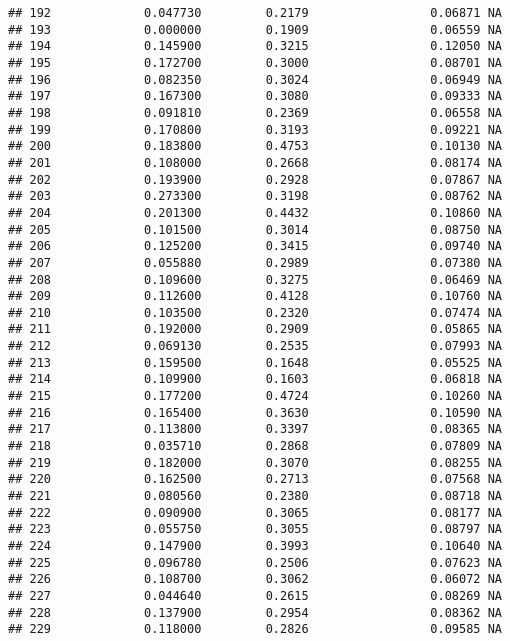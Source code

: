 \documentclass[
]{article}
\begin{document}
\begin{verbatim}
## 192             0.047730         0.2179                 0.06871 NA
## 193             0.000000         0.1909                 0.06559 NA
## 194             0.145900         0.3215                 0.12050 NA
## 195             0.172700         0.3000                 0.08701 NA
## 196             0.082350         0.3024                 0.06949 NA
## 197             0.167300         0.3080                 0.09333 NA
## 198             0.091810         0.2369                 0.06558 NA
## 199             0.170800         0.3193                 0.09221 NA
## 200             0.183800         0.4753                 0.10130 NA
## 201             0.108000         0.2668                 0.08174 NA
## 202             0.193900         0.2928                 0.07867 NA
## 203             0.273300         0.3198                 0.08762 NA
## 204             0.201300         0.4432                 0.10860 NA
## 205             0.101500         0.3014                 0.08750 NA
## 206             0.125200         0.3415                 0.09740 NA
## 207             0.055880         0.2989                 0.07380 NA
## 208             0.109600         0.3275                 0.06469 NA
## 209             0.112600         0.4128                 0.10760 NA
## 210             0.103500         0.2320                 0.07474 NA
## 211             0.192000         0.2909                 0.05865 NA
## 212             0.069130         0.2535                 0.07993 NA
## 213             0.159500         0.1648                 0.05525 NA
## 214             0.109900         0.1603                 0.06818 NA
## 215             0.177200         0.4724                 0.10260 NA
## 216             0.165400         0.3630                 0.10590 NA
## 217             0.113800         0.3397                 0.08365 NA
## 218             0.035710         0.2868                 0.07809 NA
## 219             0.182000         0.3070                 0.08255 NA
## 220             0.162500         0.2713                 0.07568 NA
## 221             0.080560         0.2380                 0.08718 NA
## 222             0.090900         0.3065                 0.08177 NA
## 223             0.055750         0.3055                 0.08797 NA
## 224             0.147900         0.3993                 0.10640 NA
## 225             0.096780         0.2506                 0.07623 NA
## 226             0.108700         0.3062                 0.06072 NA
## 227             0.044640         0.2615                 0.08269 NA
## 228             0.137900         0.2954                 0.08362 NA
## 229             0.118000         0.2826                 0.09585 NA

\end{verbatim}
\end{document}
